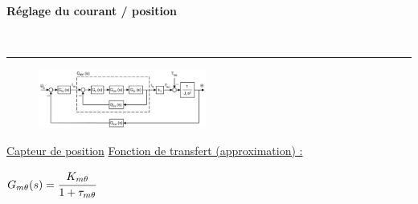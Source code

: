 \documentclass[	DIV=calc,%
							paper=a4,%
							fontsize=10pt,%
							twocolumn]{scrartcl} %
\newcounter{mycounter}
\newcommand{\formdesc}[1]{\large\textbf{#1} \addtocounter{mycounter}{1} \hfill \themycounter \\ \vspace{-3mm} \hrule \vspace{2mm}}
\newcommand{\formtitle}[1]{\large\underline{#1}}
\begin{document}
\formdesc{Réglage du courant / position}
\begin{figure}[H]
    \begin{center}
        \includegraphics[width = 0.49\textwidth]{img/Regulation_courrant_pos.JPG}
    \end{center}
\end{figure}

\formtitle{Capteur de position}
\underline{Fonction de transfert (approximation) :}

\vspace{3mm}
$G_{m\theta}(s) = \cfrac{K_{m\theta}}{1+\tau_{m\theta}} $
\end{document}
